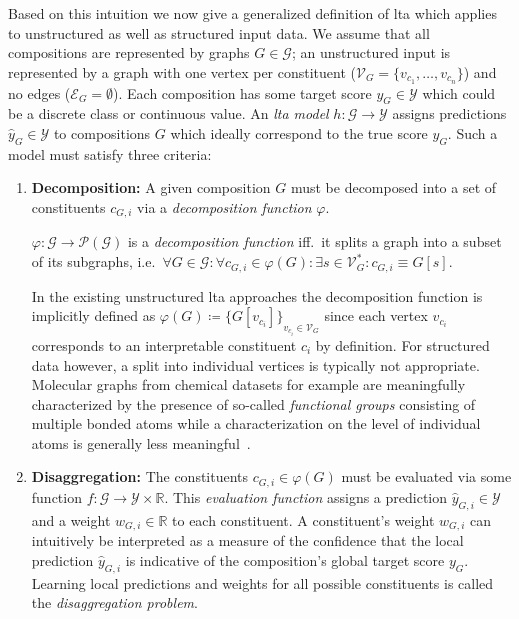 Based on this intuition we now give a generalized definition of \ac{lta} which applies to unstructured as well as structured input data.
We assume that all compositions are represented by graphs $G \in \mathcal{G}$;
an unstructured input is represented by a graph with one vertex per constituent ($\mathcal{V}_G = \{ v_{c_1}, \dots, v_{c_n} \}$) and no edges ($\mathcal{E}_G = \emptyset$).
Each composition has some target score $y_G \in \mathcal{Y}$ which could be a discrete class or continuous value.
An \textit{\ac{lta} model} $h: \mathcal{G} \to \mathcal{Y}$ assigns predictions $\hat{y}_G \in \mathcal{Y}$ to compositions $G$ which ideally correspond to the true score $y_G$.
Such a model must satisfy three criteria:
\begin{enumerate}[label=\textbf{\arabic*.}]
	\item \textbf{Decomposition:}
		A given composition $G$ must be decomposed into a set of constituents $c_{G,i}$ via a \textit{decomposition function} $\varphi$.
		\begin{defn}
			$\varphi: \mathcal{G} \to \mathcal{P}(\mathcal{G})$ is a \textit{decomposition function} iff.\ it splits a graph into a subset of its subgraphs, i.e.\ $\forall G \in \mathcal{G}: \forall c_{G,i} \in \varphi(G): \exists s \in \mathcal{V}_G^{*}: c_{G,i} \equiv G[s]$.
		\end{defn}

		In the existing unstructured \ac{lta} approaches the decomposition function is implicitly defined as $\varphi(G) \coloneqq {\{ G[v_{c_i}] \}}_{v_{c_i} \in \mathcal{V}_G}$ since each vertex $v_{c_i}$ corresponds to an interpretable constituent $c_i$ by definition.
		For structured data however, a split into individual vertices is typically not appropriate.
		Molecular graphs from chemical datasets for example are meaningfully characterized by the presence of so-called \textit{functional groups} consisting of multiple bonded atoms while a characterization on the level of individual atoms is generally less meaningful~\cite{McNaught1997}.
	\item \textbf{Disaggregation:}
		The constituents $c_{G, i} \in \varphi(G)$ must be evaluated via some function $f: \mathcal{G} \to \mathcal{Y} \times \mathbb{R}$.
		This \textit{evaluation function} assigns a prediction $\hat{y}_{G, i} \in \mathcal{Y}$ and a weight $w_{G, i} \in \mathbb{R}$ to each constituent.
		A constituent's weight $w_{G, i}$ can intuitively be interpreted as a measure of the confidence that the local prediction $\hat{y}_{G, i}$ is indicative of the composition's global target score $y_G$.
		Learning local predictions and weights for all possible constituents is called the \textit{disaggregation problem}.


\end{enumerate}
